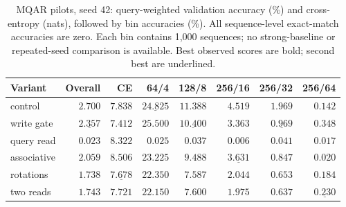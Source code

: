 \begin{table}[H]
\centering
\caption{MQAR pilots, seed 42: query-weighted validation accuracy (\%) and cross-entropy (nats), followed by bin accuracies (\%). All sequence-level exact-match accuracies are zero. Each bin contains 1,000 sequences; no strong-baseline or repeated-seed comparison is available. Best observed scores are bold; second best are underlined.}
\label{tab:mqar}
\begin{tabular}{lrrrrrrr}
\toprule
Variant & Overall & CE & 64/4 & 128/8 & 256/16 & 256/32 & 256/64 \\
\midrule
control & $\mathbf{2.700}$ & $7.838$ & $\underline{24.825}$ & $\mathbf{11.388}$ & $\mathbf{4.519}$ & $\mathbf{1.969}$ & $0.142$ \\
write gate & $\underline{2.357}$ & $\mathbf{7.412}$ & $\mathbf{25.500}$ & $\underline{10.400}$ & $3.363$ & $\underline{0.969}$ & $\mathbf{0.348}$ \\
query read & $0.023$ & $8.322$ & $0.025$ & $0.037$ & $0.006$ & $0.041$ & $0.017$ \\
associative & $2.059$ & $8.506$ & $23.225$ & $9.488$ & $\underline{3.631}$ & $0.847$ & $0.020$ \\
rotations & $1.738$ & $\underline{7.678}$ & $22.350$ & $7.587$ & $2.044$ & $0.653$ & $0.184$ \\
two reads & $1.743$ & $7.721$ & $22.150$ & $7.600$ & $1.975$ & $0.637$ & $\underline{0.230}$ \\
\bottomrule
\end{tabular}
\end{table}
